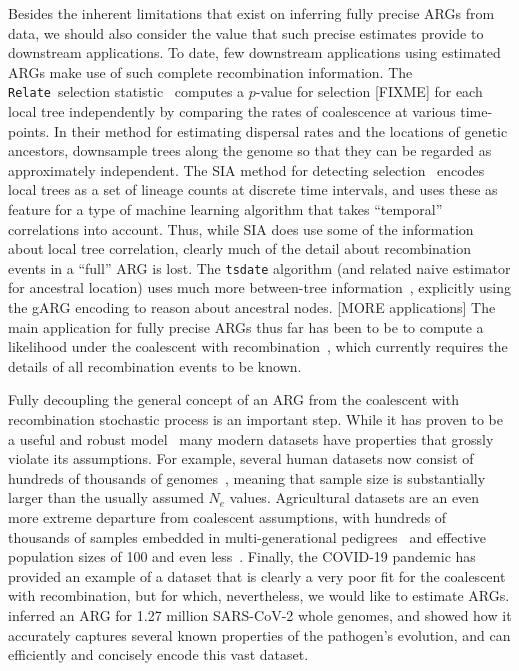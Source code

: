\documentclass{article}
\newcommand{\relate}[0]{\texttt{Relate}}
\begin{document}
Besides the inherent limitations that exist on inferring fully precise ARGs
from data,
we should also consider the value that such precise estimates provide
to downstream applications.
To date, few downstream applications using estimated ARGs
make use of such complete recombination information.
The \relate\ selection statistic~\citep{speidel2019method}
computes a $p$-value for selection [FIXME] for each
local tree independently by comparing the rates of coalescence
at various time-points.
In their method
for estimating dispersal rates and the locations of genetic
ancestors,
\citep{osmond2021estimating} downsample trees along the genome
so that they can be regarded as approximately independent.
The SIA method for detecting selection~\citep{hejase2022deep}
encodes local trees as a set of lineage counts at discrete
time intervals, and uses these as feature for a
type of machine learning algorithm
that takes ``temporal'' correlations into account. Thus,
while SIA does use some of the information about local tree correlation,
clearly much of the detail about recombination
events in a ``full'' ARG is lost.
The \texttt{tsdate} algorithm (and related naive estimator
for ancestral location) uses much more between-tree
information~\citep{wohns2022unified}, explicitly using the gARG
encoding to reason about ancestral nodes.
[MORE applications]
The main application for fully precise ARGs thus far has been
to be to compute a likelihood under the coalescent with
recombination~\citep[e.g.][]{kuhner2000maximum,mahmoudi2022bayesian},
which currently requires the details of all recombination
events to be known.

Fully decoupling the general concept of an ARG from the coalescent
with recombination stochastic process is an important step.
While it has proven to be a useful and
robust model~\citep{wakeley2012gene,bhaskar2014distortion,nelson2020accounting}
many modern datasets have properties that grossly
violate its assumptions.
For example, several human datasets now consist of hundreds of thousands of
genomes~\citep{bycroft2018genome,karczewski2020mutational,tanjo2021practical},
meaning that sample size is substantially larger than the
usually assumed $N_e$ values.
Agricultural datasets are an even more extreme departure from coalescent
assumptions, with hundreds of thousands of samples embedded in
multi-generational pedigrees~\citep{hayes20191000,Ros-Freixedes2020}
and effective population sizes of 100 and even
less~\citep{MacLeod2013,Makanjuola2020,Hall2016,Porcnic2016}.
Finally, the COVID-19 pandemic has provided an example of a dataset that
is clearly a very poor fit for the coalescent with recombination,
but for which,
nevertheless, we would like to estimate ARGs.
\cite{zhan2023towards} inferred an ARG for 1.27 million SARS-CoV-2 whole
genomes, and showed how it accurately captures several known properties of
the pathogen's evolution, and can efficiently and concisely
encode this vast dataset.
\end{document}
